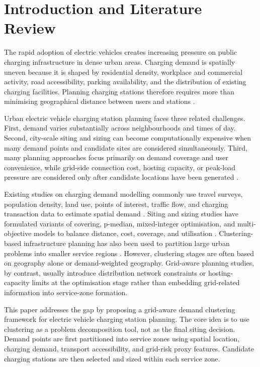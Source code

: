 \section{Introduction and Literature Review}

The rapid adoption of electric vehicles creates increasing pressure on public charging infrastructure in dense urban areas. Charging demand is spatially uneven because it is shaped by residential density, workplace and commercial activity, road accessibility, parking availability, and the distribution of existing charging facilities. Planning charging stations therefore requires more than minimising geographical distance between users and stations \cite{chen2013parking,cslpReview2021}.

Urban electric vehicle charging station planning faces three related challenges. First, demand varies substantially across neighbourhoods and times of day. Second, city-scale siting and sizing can become computationally expensive when many demand points and candidate sites are considered simultaneously. Third, many planning approaches focus primarily on demand coverage and user convenience, while grid-side connection cost, hosting capacity, or peak-load pressure are considered only after candidate locations have been generated \cite{appliedEnergy2016,ifacGrid2020}.

Existing studies on charging demand modelling commonly use travel surveys, population density, land use, points of interest, traffic flow, and charging transaction data to estimate spatial demand \cite{chen2013parking}. Siting and sizing studies have formulated variants of covering, p-median, mixed-integer optimisation, and multi-objective models to balance distance, cost, coverage, and utilisation \cite{cslpReview2021,congestion2023}. Clustering-based infrastructure planning has also been used to partition large urban problems into smaller service regions \cite{kalakanti2022planning,energyReports2024}. However, clustering stages are often based on geography alone or demand-weighted geography. Grid-aware planning studies, by contrast, usually introduce distribution network constraints or hosting-capacity limits at the optimisation stage rather than embedding grid-related information into service-zone formation.

This paper addresses the gap by proposing a grid-aware demand clustering framework for electric vehicle charging station planning. The core idea is to use clustering as a problem decomposition tool, not as the final siting decision. Demand points are first partitioned into service zones using spatial location, charging demand, transport accessibility, and grid-risk proxy features. Candidate charging stations are then selected and sized within each service zone.

